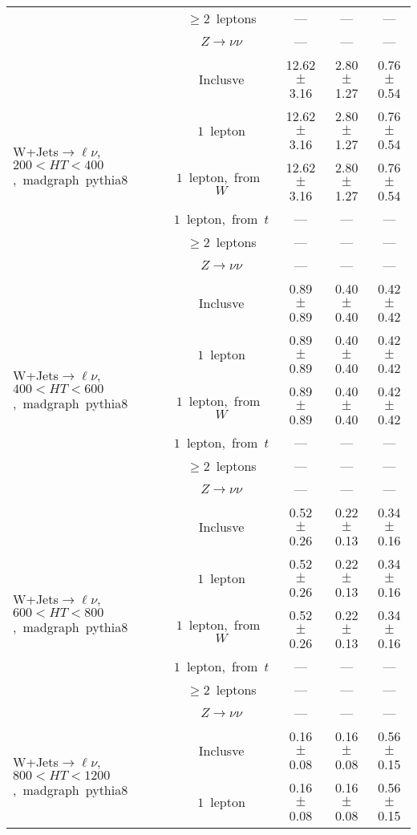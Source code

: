 \documentclass{article}
\begin{document}
\begin{longtable}{|l|c|c|c|c|}
 & $\ge2$~leptons  & ---  & ---  & --- \\* 
 & $Z\rightarrow\nu\nu$  & ---  & ---  & --- \\* 
\hline 
\multirow{6}{*}{W+Jets$\rightarrow\ell\nu$,~$200<HT<400$,~madgraph~pythia8} & Inclusve  & 12.62 $\pm$ 3.16  & 2.80 $\pm$ 1.27  & 0.76 $\pm$ 0.54 \\* 
 & $1$~lepton  & 12.62 $\pm$ 3.16  & 2.80 $\pm$ 1.27  & 0.76 $\pm$ 0.54 \\* 
 & $1$~lepton,~from~$W$  & 12.62 $\pm$ 3.16  & 2.80 $\pm$ 1.27  & 0.76 $\pm$ 0.54 \\* 
 & $1$~lepton,~from~$t$  & ---  & ---  & --- \\* 
 & $\ge2$~leptons  & ---  & ---  & --- \\* 
 & $Z\rightarrow\nu\nu$  & ---  & ---  & --- \\* 
\hline 
\multirow{6}{*}{W+Jets$\rightarrow\ell\nu$,~$400<HT<600$,~madgraph~pythia8} & Inclusve  & 0.89 $\pm$ 0.89  & 0.40 $\pm$ 0.40  & 0.42 $\pm$ 0.42 \\* 
 & $1$~lepton  & 0.89 $\pm$ 0.89  & 0.40 $\pm$ 0.40  & 0.42 $\pm$ 0.42 \\* 
 & $1$~lepton,~from~$W$  & 0.89 $\pm$ 0.89  & 0.40 $\pm$ 0.40  & 0.42 $\pm$ 0.42 \\* 
 & $1$~lepton,~from~$t$  & ---  & ---  & --- \\* 
 & $\ge2$~leptons  & ---  & ---  & --- \\* 
 & $Z\rightarrow\nu\nu$  & ---  & ---  & --- \\* 
\hline 
\multirow{6}{*}{W+Jets$\rightarrow\ell\nu$,~$600<HT<800$,~madgraph~pythia8} & Inclusve  & 0.52 $\pm$ 0.26  & 0.22 $\pm$ 0.13  & 0.34 $\pm$ 0.16 \\* 
 & $1$~lepton  & 0.52 $\pm$ 0.26  & 0.22 $\pm$ 0.13  & 0.34 $\pm$ 0.16 \\* 
 & $1$~lepton,~from~$W$  & 0.52 $\pm$ 0.26  & 0.22 $\pm$ 0.13  & 0.34 $\pm$ 0.16 \\* 
 & $1$~lepton,~from~$t$  & ---  & ---  & --- \\* 
 & $\ge2$~leptons  & ---  & ---  & --- \\* 
 & $Z\rightarrow\nu\nu$  & ---  & ---  & --- \\* 
\hline 
\multirow{6}{*}{W+Jets$\rightarrow\ell\nu$,~$800<HT<1200$,~madgraph~pythia8} & Inclusve  & 0.16 $\pm$ 0.08  & 0.16 $\pm$ 0.08  & 0.56 $\pm$ 0.15 \\* 
 & $1$~lepton  & 0.16 $\pm$ 0.08  & 0.16 $\pm$ 0.08  & 0.56 $\pm$ 0.15 \\* 

\end{longtable}
\end{document}

